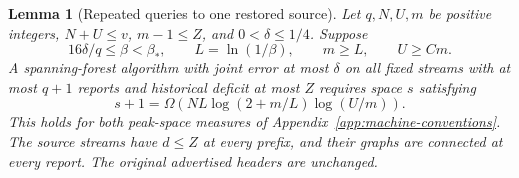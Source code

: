 \documentclass[11pt,letterpaper]{article}
\newtheorem{lemma}[theorem]{Lemma}
\numberwithin{equation}{section}
\begin{document}
\begin{lemma}[Repeated queries to one restored source]
\label{lem:restored-source-confidence}
Let $q,N,U,m$ be positive integers, $N+U\le v$, $m-1\le Z$, and $0<\delta\le1/4$.
Suppose
\begin{equation}
16\delta/q\le\beta<\beta_*,\qquad
 L=\ln(1/\beta),\qquad m\ge L,
 \qquad U\ge Cm.                                  \label{eq:sj3}
\end{equation}
A spanning-forest algorithm with joint error at most $\delta$ on all fixed streams with at most $q+1$ reports and historical deficit at most $Z$ requires space $s$ satisfying
\begin{equation}
s+1=\Omega\!\left(
 NL\log(2+m/L)\log(U/m)\right).                    \label{eq:sj4}
\end{equation}
This holds for both peak-space measures of Appendix~\ref{app:machine-conventions}.
The source streams have $d\le Z$ at every prefix, and their graphs are connected at every report.
The original advertised headers are unchanged.
\end{lemma}
\end{document}
